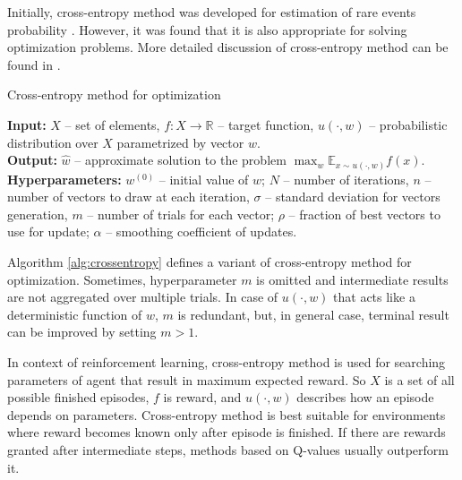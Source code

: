 \documentclass{article}
\begin{document}
Initially, cross-entropy method was developed for estimation of rare events probability \cite{rubinstein1997optimization}. However, it was found that it is also appropriate for solving optimization problems. More detailed discussion of cross-entropy method can be found in \cite{boer2005tutorial}.

\begin{algorithm}
	\caption{Cross-entropy method for optimization} \label{alg:crossentropy}
	\textbf{Input:} $X$ -- set of elements, $f: X \to \mathbb{R}$ -- target function, $u(\cdot, w)$ -- probabilistic distribution over $X$ parametrized by vector $w$. \\
	\textbf{Output:} $\hat{w}$ -- approximate solution to the problem $\max_w \mathbb{E}_{x \sim u(\cdot, w)} f(x)$. \\
	\textbf{Hyperparameters:} $w^{(0)}$ -- initial value of $w$; $N$ -- number of iterations, $n$ -- number of vectors to draw at each iteration, $\sigma$ -- standard deviation for vectors generation, $m$ -- number of trials for each vector; $\rho$ -- fraction of best vectors to use for update; $\alpha$ -- smoothing coefficient of updates.
	\begin{algorithmic}[1]
		    \ENDFOR
		\ENDFOR
	\end{algorithmic}
\end{algorithm}

Algorithm \ref{alg:crossentropy} defines a variant of cross-entropy method for optimization. Sometimes, hyperparameter $m$ is omitted and intermediate results are not aggregated over multiple trials. In case of $u(\cdot, w)$ that acts like a deterministic function of $w$, $m$ is redundant, but, in general case, terminal result can be improved by setting $m > 1$.

In context of reinforcement learning, cross-entropy method is used for searching parameters of agent that result in maximum expected reward. So $X$ is a set of all possible finished episodes, $f$ is reward, and $u(\cdot, w)$ describes how an episode depends on parameters. Cross-entropy method is best suitable for environments where reward becomes known only after episode is finished. If there are rewards granted after intermediate steps, methods based on Q-values usually outperform it.
\end{document}
